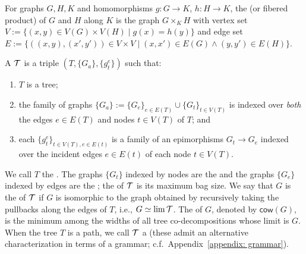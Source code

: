     \begin{definition}\label{def:pullback}
        For graphs $G,H,K$ and homomorphisms $g \colon G \to K$, $h \colon H \to K$, the  (or fibered product) of $G$ and $H$ along $K$ is the graph $G \times_K H$ with vertex set $V:=\{(x,y)\in V(G)\times V(H) \mid g(x)=h(y)\}$ and edge set $E:=\{((x,y),(x',y'))\in V\times V \mid (x,x')\in E(G)\wedge (y,y')\in E(H)\}$.
    \end{definition}
\label{para: pullback Leticia}
\newpage
\begin{definition}\label{def:tree_codecomp}
    A  $\operatorname{\mathcal{T}}$ is a triple $(T, \{G_a\},\{g_t^e\})$ such that: \vspace{-.5em}
    \begin{enumerate}
        \item $T$ is a tree;\vspace{-.5em}
        \item the family of graphs $\{G_a\}:=\{G_e\}_{e \in E(T)}\cup\{G_t\}_{t \in V(T)}$ is indexed over \textit{both} the edges $e\in E(T)$ and nodes $t\in V(T)$ of $T$; and \vspace{-.5em}
        \item each $\{g_t^e\}_{t\in V(T),e\in E(t)}$ is a family of an epimorphisms $G_t\to G_e$ indexed over the incident edges $e\in E(t)$ of each node $t\in V(T)$.\vspace{-.5em}
    \end{enumerate} 
    We call $T$ the . The graphs $\{G_t\}$ indexed by nodes are the  and the graphs $\{G_e\}$ indexed by edges are the ; the  of $\operatorname{\mathcal{T}}$ is its maximum bag size.
    We say that $G$ is the  of $\operatorname{\mathcal{T}}$ if $G$ is isomorphic to the graph obtained by recursively taking the pullbacks along the edges of $T$, i.e., $G \simeq \lim \operatorname{\mathcal{T}}$.
    The  of $G$, denoted by $\mathsf{cow}(G)$, is the minimum among the widths of all tree co-decompositions whose limit is $G$.
    When the tree $T$ is a path, we call $\operatorname{\mathcal{T}}$ a  (these admit an alternative characterization in terms of a grammar; c.f.~Appendix~\ref{appendix: grammar}).
\end{definition}


